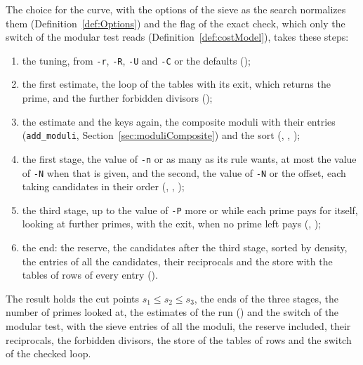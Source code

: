 \begin{definition}\label{def:choiceOfModuli}
  \leanok
  The choice for the curve, with the options of the sieve as the search normalizes them
  (Definition~\ref{def:Options}) and the flag of the exact check, which only the switch of the
  modular test reads (Definition~\ref{def:costModel}), takes these steps:
  \begin{enumerate}
    \item the tuning, from \verb|-r|, \verb|-R|, \verb|-U| and \verb|-C| or the defaults
      ();
    \item the first estimate, the loop of the tables with its exit, which returns the prime, and
      the further forbidden divisors ();
    \item the estimate and the keys again, the composite moduli with their entries (\verb|add_moduli|,
      Section~\ref{sec:moduliComposite}) and the sort
      (, ,
      );
    \item the first stage, the value of \verb|-n| or as many as its rule wants, at most the value
      of \verb|-N| when that is given, and the second, the value of \verb|-N| or the offset, each
      taking candidates in their order
      (, ,
      );
    \item the third stage, up to the value of \verb|-P| more or while each prime pays for itself,
      looking at further primes, with the exit, when no prime left pays
      (, );
    \item the end: the reserve, the candidates after the third stage, sorted by density, the entries
      of all the candidates, their reciprocals and the store with the tables of rows of every entry
      ().
  \end{enumerate}
  The result holds the cut points $s_1 \le s_2 \le s_3$, the ends of the three stages, the number of
  primes looked at, the estimates of the run () and the switch of the
  modular test, with the sieve entries of all the moduli, the reserve included, their reciprocals,
  the forbidden divisors, the store of the tables of rows and the switch of the checked loop.
\end{definition}

